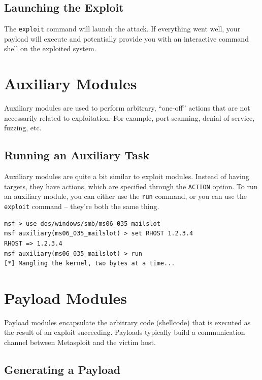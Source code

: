 \documentclass{report}
\begin{document}
		\subsection{Launching the Exploit}

\par
The \texttt{exploit} command will launch the attack. If everything went well,
your payload will execute and potentially provide you with an interactive
command shell on the exploited system.

	\section{Auxiliary Modules}

\par
Auxiliary modules are used to perform arbitrary, ``one-off'' actions that are
not necessarily related to exploitation. For example, port scanning, denial of
service, fuzzing, etc.
	
		\subsection{Running an Auxiliary Task}

\par
Auxiliary modules are quite a bit similar to exploit modules. Instead of having
targets, they have actions, which are specified through the \texttt{ACTION}
option. To run an auxiliary module, you can either use the \texttt{run} command,
or you can use the \texttt{exploit} command -- they're both the same thing.

\begin{verbatim}
msf > use dos/windows/smb/ms06_035_mailslot
msf auxiliary(ms06_035_mailslot) > set RHOST 1.2.3.4
RHOST => 1.2.3.4
msf auxiliary(ms06_035_mailslot) > run
[*] Mangling the kernel, two bytes at a time...
\end{verbatim}

	\section{Payload Modules}

\par
Payload modules encapsulate the arbitrary code (shellcode) that is executed as
the result of an exploit succeeding. Payloads typically build a communication
channel between Metasploit and the victim host.

		\subsection{Generating a Payload}
\end{document}
